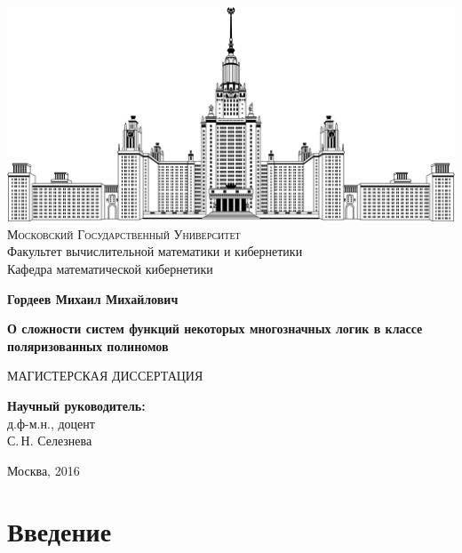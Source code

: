\documentclass[bibliography=totoc, a4paper, 12pt]{extarticle}
\let\stdsection\section
\renewcommand\section{\newpage\stdsection}
\begin{document}
\thispagestyle {empty}

\begin {center}

\includegraphics [width = 0.5 \textwidth] {msu.png} \\
{\scshape Московский Государственный Университет} \\
Факультет вычислительной математики и кибернетики \\
Кафедра математической кибернетики \\

\vspace {3cm}

{\large \bfseries Гордеев Михаил Михайлович}

\vspace {0.5cm}

{\LARGE \bfseries
О сложности систем функций некоторых многозначных логик в классе поляризованных
полиномов \\}

\vspace{3cm}

{МАГИСТЕРСКАЯ ДИССЕРТАЦИЯ}

\end {center}

\vfill
\vfill

\begin {flushright}
  \large
  \textbf{Научный руководитель:} \\
  д.ф-м.н., доцент \\
  С.\,Н. Селезнева

\end {flushright}

\vfill
\vfill

\begin {center}
Москва, 2016
\end {center}

\vfill

\enlargethispage {4 \baselineskip}

\newpage

\setcounter{page}{2}
\setcounter{secnumdepth}{-1}

\tableofcontents

\section{Введение}
\end{document}
